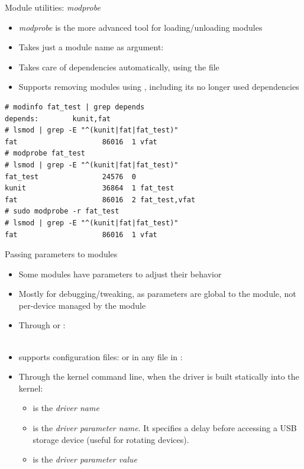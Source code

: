 \begin{frame}[fragile]{Module utilities: {\em modprobe}}
  \begin{itemize}
  \item {\em modprobe} is the more advanced tool for loading/unloading
    modules
  \item Takes just a module name as argument: 
  \item Takes care of dependencies automatically, using the
     file
  \item Supports removing modules using , including
    its no longer used dependencies
  \end{itemize}

  \begin{block}{}
    {\tiny
\begin{verbatim}
# modinfo fat_test | grep depends
depends:        kunit,fat
# lsmod | grep -E "^(kunit|fat|fat_test)"
fat                    86016  1 vfat
# modprobe fat_test
# lsmod | grep -E "^(kunit|fat|fat_test)"
fat_test               24576  0
kunit                  36864  1 fat_test
fat                    86016  2 fat_test,vfat
# sudo modprobe -r fat_test
# lsmod | grep -E "^(kunit|fat|fat_test)"
fat                    86016  1 vfat
\end{verbatim}
    }
  \end{block}
\end{frame}

\begin{frame}{Passing parameters to modules}
  \small
  \begin{itemize}
  \item Some modules have parameters to adjust their behavior
  \item Mostly for debugging/tweaking, as parameters are global to the
    module, not per-device managed by the module
  \item Through  or :\\
    \\
  \item {} supports configuration files:  or in any file in :\\
  \item Through the kernel command line, when the driver is built statically into the kernel:\\
    \begin{itemize}
    \item {} is the {\em driver name}
    \item {} is the {\em driver parameter name}. It
      specifies a delay before accessing a USB storage device (useful for
      rotating devices).
    \item {} is the {\em driver parameter value}
    \end{itemize}
  \end{itemize}
\end{frame}

